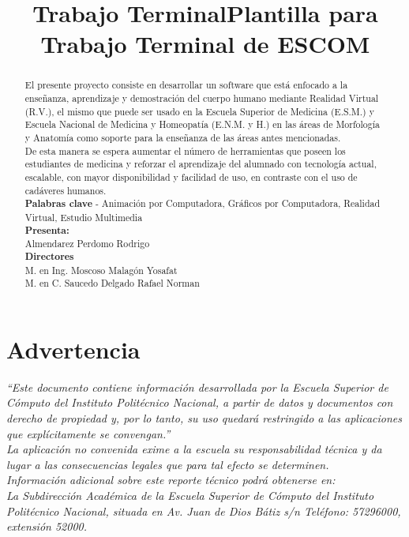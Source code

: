 \documentclass[11pt]{report}
\title{Trabajo Terminal}
\title{Plantilla para Trabajo Terminal de ESCOM}
\begin{document}


\begin{abstract}												
\begin{minipage}{0.48\textwidth} \begin{flushleft}
\end{flushleft}\end{minipage}
\begin{minipage}{0.48\textwidth} \begin{flushright}
\end{flushright}\end{minipage}

El presente proyecto consiste en desarrollar un software que está enfocado a la enseñanza, aprendizaje y demostración del cuerpo humano mediante Realidad Virtual (R.V.), el mismo que puede ser usado en la Escuela Superior de Medicina (E.S.M.) y Escuela Nacional de Medicina y Homeopatía (E.N.M. y H.) en las áreas de Morfología y Anatomía como soporte para la enseñanza de las áreas antes mencionadas. 
\\
De esta manera se espera aumentar el número de herramientas que poseen los estudiantes de medicina y reforzar el aprendizaje del alumnado con tecnología actual, escalable, con mayor disponibilidad y facilidad de uso, en contraste con el uso de cadáveres humanos.
\\[4cm]
\textbf{Palabras clave} - Animación por Computadora, Gráficos por Computadora, Realidad Virtual, Estudio Multimedia
\\[2cm]
\textbf{Presenta:}
\\[0.5cm]
Almendarez Perdomo Rodrigo
\\[2cm]
\textbf{Directores}
\\[0.5cm]
M. en Ing. Moscoso Malagón Yosafat
\\
M. en C. Saucedo Delgado Rafael Norman
\\
\end{abstract}							

\newpage	
\section*{Advertencia}
\vfill
\textit{“Este documento contiene información desarrollada por la Escuela Superior de Cómputo del Instituto Politécnico Nacional, a partir de datos y documentos con derecho de propiedad y, por lo tanto, su uso quedará restringido a las aplicaciones que explícitamente se convengan.”
\\
La aplicación no convenida exime a la escuela su responsabilidad técnica y da lugar a las consecuencias legales que para tal efecto se determinen. 
\\
Información adicional sobre este reporte técnico podrá obtenerse en: 
\\
La Subdirección Académica de la Escuela Superior de Cómputo del Instituto Politécnico Nacional, situada en Av. Juan de Dios Bátiz s/n Teléfono: 57296000, extensión 52000.}
\vfill
\end{document}
